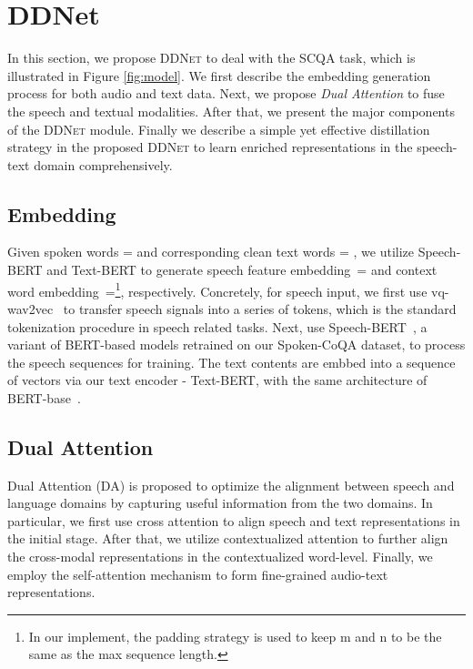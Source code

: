 \documentclass[11pt]{article}
\begin{document}
\vspace{-0.3em}
\section{DDNet}
\vspace{-0.3em}

In this section, we propose \textsc{DDNet} to deal with the SCQA task, which is illustrated in Figure \ref{fig:model}. We first describe the embedding generation process for both audio and text data. Next, we propose {\em Dual Attention} to fuse the speech and textual modalities. After that, we present the major components of the \textsc{DDNet} module. Finally we describe a simple yet effective distillation strategy in the proposed \textsc{DDNet} to learn enriched representations in the speech-text domain comprehensively.

\vspace{-0.3em}
\subsection{Embedding}
\vspace{-0.3em}
\label{subsec:cmm}
Given spoken words  =   and corresponding clean text words  = , we utilize Speech-BERT and Text-BERT to generate speech feature embedding~= and context word embedding~=\footnote{In our implement, the padding strategy is used to keep m and n to be the same as the max sequence length.}, respectively. Concretely, for speech input, we first use vq-wav2vec~\cite{baevski2019vq} to transfer speech signals into a series of tokens, which is the standard tokenization procedure in speech related tasks. Next, use Speech-BERT~\cite{chuang2019speechbert}, a variant of BERT-based models retrained on our Spoken-CoQA dataset, to process the speech sequences for training.
The text contents are embbed into a sequence of vectors via our text encoder - Text-BERT, with the same architecture of BERT-base~\cite{devlin2018bert}.

\vspace{-0.3em}
\subsection{Dual Attention}
\vspace{-0.3em}
Dual Attention (DA) is proposed to optimize the alignment between speech and language domains by capturing useful information from the two domains. In particular, we first use cross attention to align speech and text representations in the initial stage. After that, we utilize contextualized attention to further align the cross-modal representations in the contextualized word-level. Finally, we employ the self-attention mechanism to form fine-grained audio-text representations.
\end{document}
